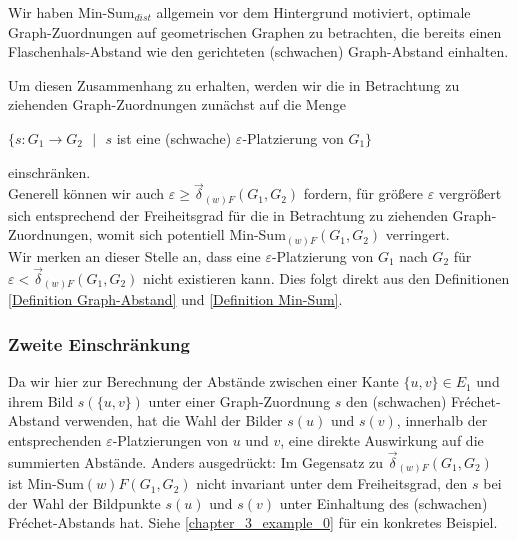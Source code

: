 \documentclass[a4paper, 12pt, twoside]{article}
\theoremstyle{Format1} %
\begin{document}
Wir haben Min-Sum$_{dist}$ allgemein vor dem Hintergrund motiviert, optimale Graph-Zuordnungen auf geometrischen Graphen zu betrachten,
die bereits einen Flaschenhals-Abstand wie den gerichteten (schwachen) Graph-Abstand einhalten.

Um diesen Zusammenhang zu erhalten, werden wir die in Betrachtung zu ziehenden Graph-Zuordnungen zunächst auf die Menge
\begin{center}
	$\{s: G_1 \to G_2 \text{ $|$ } s$ ist eine (schwache) $\varepsilon$-Platzierung von $G_1 \}$
\end{center}
einschränken.
\\
Generell können wir auch $\varepsilon \geq \vec{\delta}_{(w)F}(G_1, G_2)$ fordern, für größere $\varepsilon$ vergrößert sich entsprechend der Freiheitsgrad für die
in Betrachtung zu ziehenden Graph-Zuordnungen, womit sich potentiell Min-Sum$_{(w)F}(G_1, G_2)$ verringert.
\\
Wir merken an dieser Stelle an, dass eine $\varepsilon$-Platzierung von $G_1$ nach $G_2$ für $\varepsilon < \vec{\delta}_{(w)F}(G_1,G_2)$
nicht existieren kann. Dies folgt direkt aus den Definitionen \ref{Definition Graph-Abstand} und \ref{Definition Min-Sum}.

\subsubsection{Zweite Einschränkung} \label {Zweite Einschränkung}
Da wir hier zur Berechnung der Abstände zwischen einer Kante $\{u,v\} \in E_1$ und ihrem Bild $s(\{u,v\})$ unter einer Graph-Zuordnung $s$ den (schwachen) Fréchet-Abstand verwenden,
hat die Wahl der Bilder $s(u)$ und $s(v)$, innerhalb der entsprechenden $\varepsilon$-Platzierungen von $u$ und $v$, eine direkte Auswirkung auf die summierten Abstände.
Anders ausgedrückt: Im Gegensatz zu $\vec{\delta}_{(w)F}(G_1,G_2)$ ist Min-Sum${(w)F}(G_1,G_2)$ nicht invariant unter dem Freiheitsgrad, den $s$
bei der Wahl der Bildpunkte $s(u)$ und $s(v)$ unter Einhaltung des (schwachen) Fréchet-Abstands hat. Siehe \ref{chapter_3_example_0} für ein konkretes Beispiel.
\end{document}
